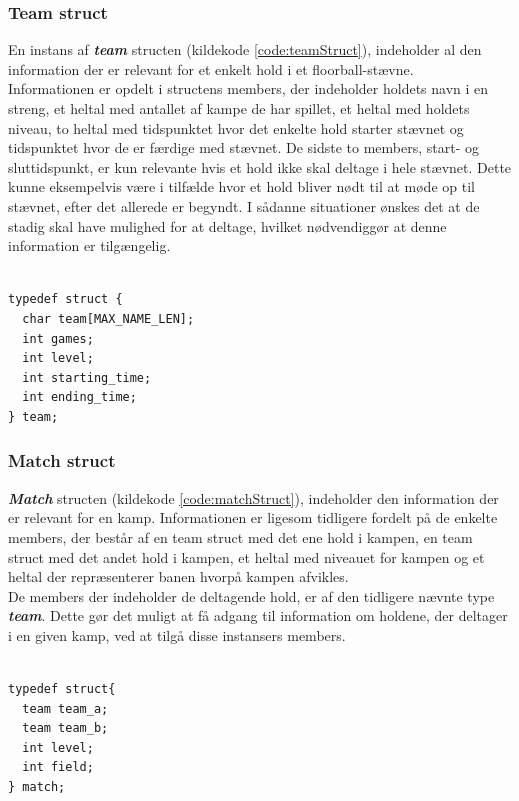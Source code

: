 \subsubsection{Team struct}
En instans af \textbf{\textit{team}} structen (kildekode \ref{code:teamStruct}), indeholder al den information der er relevant for et enkelt hold i et floorball-stævne. \\
Informationen er opdelt i structens members, der indeholder holdets navn i en streng, et heltal med antallet af kampe de har spillet, et heltal med holdets niveau, to heltal med tidspunktet hvor det enkelte hold starter stævnet og tidspunktet hvor de er færdige med stævnet. 
De sidste to members, start- og sluttidspunkt, er kun relevante hvis et hold ikke skal deltage i hele stævnet. Dette kunne eksempelvis være i tilfælde hvor et hold bliver nødt til at møde op til stævnet, efter det allerede er begyndt. 
I sådanne situationer ønskes det at de stadig skal have mulighed for at deltage, hvilket nødvendiggør at denne information er tilgængelig.
\begin{listing}[H]
\begin{verbatim}

typedef struct {
  char team[MAX_NAME_LEN];
  int games;
  int level;
  int starting_time;
  int ending_time;
} team;

\end{verbatim}
\label{code:teamStruct}
\end{listing}

\subsubsection{Match struct}
\textbf{\textit{Match}} structen (kildekode \ref{code:matchStruct}), indeholder den information der er relevant for en kamp. Informationen er ligesom tidligere fordelt på de enkelte members, der består af en team struct med det ene hold i kampen, en team struct med det andet hold i kampen, et heltal med niveauet for kampen og et heltal der repræsenterer banen hvorpå kampen afvikles. \\
De members der indeholder de deltagende hold, er af den tidligere nævnte type \textbf{\textit{team}}. Dette gør det muligt at få adgang til information om holdene, der deltager i en given kamp, ved at tilgå disse instansers members.

\begin{listing}
\begin{verbatim}

typedef struct{
  team team_a;
  team team_b;
  int level;
  int field;
} match;

\end{verbatim}
\label{code:matchStruct}
\end{listing}

